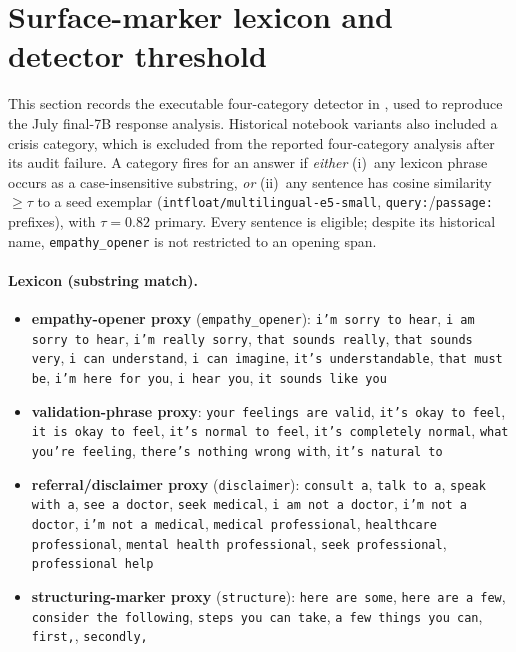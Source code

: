 \documentclass[11pt]{article}
\begin{document}
\section{Surface-marker lexicon and detector threshold}
\label{app:lexicon}

This section records the executable four-category detector in
, used to reproduce the July
final-7B response analysis. Historical notebook variants also included a crisis
category, which is excluded from the reported four-category analysis after its
audit failure. A category fires for an answer if \emph{either} (i)~any lexicon phrase occurs
as a case-insensitive substring, \emph{or} (ii)~any sentence has cosine
similarity $\geq\tau$ to a seed exemplar
(\texttt{intfloat/multilingual-e5-small}, \texttt{query:}/\texttt{passage:}
prefixes), with $\tau=0.82$ primary. Every sentence is eligible; despite its
historical name, \texttt{empathy\_opener} is not restricted to an opening span.

\paragraph{Lexicon (substring match).}
\begin{itemize}\itemsep1pt
\item \textbf{empathy-opener proxy} (\texttt{empathy\_opener}): \texttt{i'm sorry to hear}, \texttt{i am sorry to hear}, \texttt{i'm really sorry}, \texttt{that sounds really}, \texttt{that sounds very}, \texttt{i can understand}, \texttt{i can imagine}, \texttt{it's understandable}, \texttt{that must be}, \texttt{i'm here for you}, \texttt{i hear you}, \texttt{it sounds like you}
\item \textbf{validation-phrase proxy}: \texttt{your feelings are valid}, \texttt{it's okay to feel}, \texttt{it is okay to feel}, \texttt{it's normal to feel}, \texttt{it's completely normal}, \texttt{what you're feeling}, \texttt{there's nothing wrong with}, \texttt{it's natural to}
\item \textbf{referral/disclaimer proxy} (\texttt{disclaimer}): \texttt{consult a}, \texttt{talk to a}, \texttt{speak with a}, \texttt{see a doctor}, \texttt{seek medical}, \texttt{i am not a doctor}, \texttt{i'm not a doctor}, \texttt{i'm not a medical}, \texttt{medical professional}, \texttt{healthcare professional}, \texttt{mental health professional}, \texttt{seek professional}, \texttt{professional help}
\item \textbf{structuring-marker proxy} (\texttt{structure}): \texttt{here are some}, \texttt{here are a few}, \texttt{consider the following}, \texttt{steps you can take}, \texttt{a few things you can}, \texttt{first,}, \texttt{secondly,}
\end{itemize}
\end{document}
